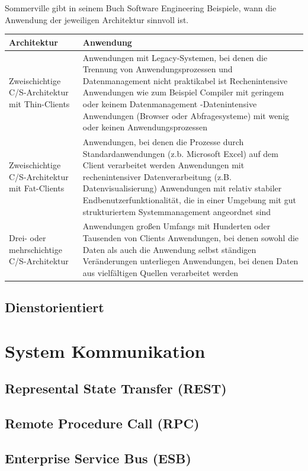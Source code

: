 	Sommerville gibt in seinem Buch Software Engineering Beispiele, wann die Anwendung der jeweiligen Architektur sinnvoll ist.
	
	
	\begin{tabular}{|p{3.5cm}|p{12.5cm}|}
		\hline 
		Architektur & Anwendung \\ 
		\hline 
		Zweischichtige C/S-Architektur mit Thin-Clients & Anwendungen mit Legacy-Systemen, bei denen die Trennung von Anwendungsprozessen und Datenmanagement nicht praktikabel ist Rechenintensive Anwendungen wie zum Beispiel Compiler mit geringem oder keinem Datenmanagement -Datenintensive Anwendungen (Browser oder Abfragesysteme) mit wenig oder keinen Anwendungsprozessen \\
		\hline 
		Zweischichtige C/S-Architektur mit Fat-Clients & Anwendungen, bei denen die Prozesse durch Standardanwendungen (z.b. Microsoft Excel) auf dem Client verarbeitet werden Anwendungen mit rechenintensiver Datenverarbeitung (z.B. Datenvisualisierung) Anwendungen mit relativ stabiler Endbenutzerfunktionalität, die in einer Umgebung mit gut strukturiertem Systemmanagement angeordnet sind \\ 
		\hline 
		Drei- oder mehrschichtige C/S-Architektur & Anwendungen großen Umfangs mit Hunderten oder Tausenden von Clients Anwendungen, bei denen sowohl die Daten als auch die Anwendung selbst ständigen Veränderungen unterliegen Anwendungen, bei denen Daten aus vielfältigen Quellen verarbeitet werden \\ 
		\hline 
	\end{tabular} 
	
	
	
	\subsection{Dienstorientiert}

\section{System Kommunikation}
	\subsection{Represental State Transfer (REST)}
	\subsection{Remote Procedure Call (RPC)}
	\subsection{Enterprise Service Bus (ESB)}

